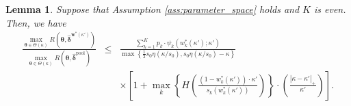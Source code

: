 \documentclass[12pt,a4paper]{article}
\newtheorem{Lemma}{Lemma}
\begin{document}
\begin{Lemma}\label{lem:pool_mis}
Suppose that Assumption \ref{ass:parameter_space} holds and $K$ is even. Then, we have
\begin{eqnarray}
\frac{\max_{\bm{\theta} \in \Theta(\kappa)} R(\bm{\theta},\hat{\bm{\delta}}^{\bm{w}^{\ast}(\kappa')})}{\max_{\bm{\theta} \in \Theta(\kappa)} R(\bm{\theta},\hat{\bm{\delta}}^{\mathrm{pool}})} & \leq & \frac{\sum_{k=1}^K p_k \cdot \psi_k\left( w_k^{\ast}(\kappa') ;\kappa' \right)}{\max \left\{ \frac{1}{2} s_0 \eta ( \kappa / s_0 ), s_0 \eta ( \kappa / s_0 ) - \kappa \right\}} \nonumber \\
& & \times  \left[ 1 + \max_{k} \left\{ H \left( \frac{(1-w_k^{\ast}(\kappa')) \cdot \kappa' }{s_k \left( w_k^{\ast}(\kappa') \right)} \right) \right\} \cdot \left( \frac{|\kappa - \kappa'|_{+}}{\kappa'} \right) \right]. \label{Thm_pool_mis}
\end{eqnarray}
\end{Lemma}
\end{document}

